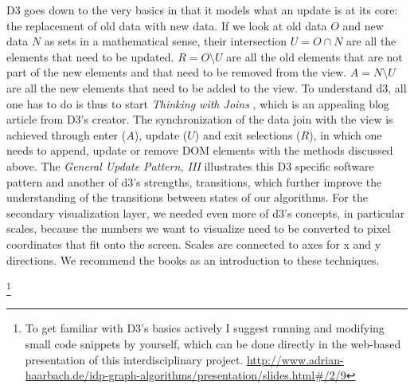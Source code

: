 D3 goes down to the very basics in that it models what an update is at its core: the replacement of old data with new data. If we look at old data $O$ and new data $N$ as sets in a mathematical sense, their intersection $U = O \cap N$ are all the elements that need to be updated. $R = O \setminus U$ are all the old elements that are not part of the new elements and that need to be removed from the view. $A = N \setminus U$ are all the new elements that need to be added to the view. To understand d3, all one has to do is thus to start \textit{Thinking with Joins} \cite{bostock2012join}, which is an appealing blog article from D3's creator. The synchronization of the data join with the view is achieved through enter ($A$), update ($U$) and exit selections ($R$), in which one needs to append, update or remove DOM elements with the methods discussed above. The \textit{General Update Pattern, III} \cite{bostock2016general} illustrates this D3 specific software pattern and another of d3's strengths, transitions, which further improve the understanding of the transitions between states of our algorithms. For the secondary visualization layer, we needed even more of d3's concepts, in particular scales, because the numbers we want to visualize need to be converted to pixel coordinates that fit onto the screen. Scales are connected to axes for x and y directions. We recommend the books \cite{murray2013interactive,zhu2013data,meeks2015d3} as an introduction to these techniques.

\footnote{To get familiar with D3's basics actively I suggest running and modifying small code snippets by yourself, which can be done directly in the web-based presentation of this interdisciplinary project. \url{http://www.adrian-haarbach.de/idp-graph-algorithms/presentation/slides.html\#/2/9}}

